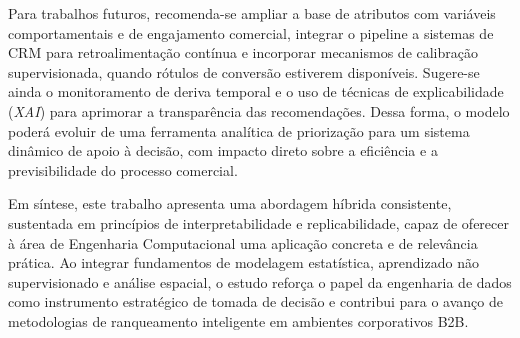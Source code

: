 Para trabalhos futuros, recomenda-se ampliar a base de atributos com variáveis comportamentais e de engajamento comercial, integrar o pipeline a sistemas de CRM para retroalimentação contínua e incorporar mecanismos de calibração supervisionada, quando rótulos de conversão estiverem disponíveis. Sugere-se ainda o monitoramento de deriva temporal e o uso de técnicas de explicabilidade (\textit{XAI}) para aprimorar a transparência das recomendações. Dessa forma, o modelo poderá evoluir de uma ferramenta analítica de priorização para um sistema dinâmico de apoio à decisão, com impacto direto sobre a eficiência e a previsibilidade do processo comercial.

Em síntese, este trabalho apresenta uma abordagem híbrida consistente, sustentada em princípios de interpretabilidade e replicabilidade, capaz de oferecer à área de Engenharia Computacional uma aplicação concreta e de relevância prática. Ao integrar fundamentos de modelagem estatística, aprendizado não supervisionado e análise espacial, o estudo reforça o papel da engenharia de dados como instrumento estratégico de tomada de decisão e contribui para o avanço de metodologias de ranqueamento inteligente em ambientes corporativos B2B.